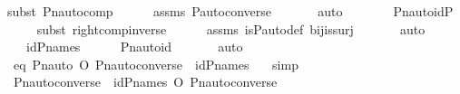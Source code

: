 \begin{isabellebody}
{\isacharparenleft}{\kern0pt}subst\ Pn{\isacharunderscore}{\kern0pt}auto{\isacharunderscore}{\kern0pt}comp{\isacharparenright}{\kern0pt}\isanewline
\ \ \ \ \isamarkupfalse%
\ assms\ P{\isacharunderscore}{\kern0pt}auto{\isacharunderscore}{\kern0pt}converse\ \isanewline
\ \ \ \ \isamarkupfalse%
\ auto\isanewline
\ \ \isamarkupfalse%
\ \isamarkupfalse%
\ {\isachardoublequoteopen}{\isachardot}{\kern0pt}{\isachardot}{\kern0pt}{\isachardot}{\kern0pt}\ {\isacharequal}{\kern0pt}\ Pn{\isacharunderscore}{\kern0pt}auto{\isacharparenleft}{\kern0pt}id{\isacharparenleft}{\kern0pt}P{\isacharparenright}{\kern0pt}{\isacharparenright}{\kern0pt}{\isachardoublequoteclose}\ \isanewline
\ \ \ \ \isamarkupfalse%
{\isacharparenleft}{\kern0pt}subst\ right{\isacharunderscore}{\kern0pt}comp{\isacharunderscore}{\kern0pt}inverse{\isacharparenright}{\kern0pt}\isanewline
\ \ \ \ \isamarkupfalse%
\ assms\ is{\isacharunderscore}{\kern0pt}P{\isacharunderscore}{\kern0pt}auto{\isacharunderscore}{\kern0pt}def\ bij{\isacharunderscore}{\kern0pt}is{\isacharunderscore}{\kern0pt}surj\ \isanewline
\ \ \ \ \isamarkupfalse%
\ auto\isanewline
\ \ \isamarkupfalse%
\ \isamarkupfalse%
\ {\isachardoublequoteopen}{\isachardot}{\kern0pt}{\isachardot}{\kern0pt}{\isachardot}{\kern0pt}\ {\isacharequal}{\kern0pt}\ id{\isacharparenleft}{\kern0pt}P{\isacharunderscore}{\kern0pt}names{\isacharparenright}{\kern0pt}{\isachardoublequoteclose}\isanewline
\ \ \ \ \isamarkupfalse%
\ Pn{\isacharunderscore}{\kern0pt}auto{\isacharunderscore}{\kern0pt}id\ \isanewline
\ \ \ \ \isamarkupfalse%
\ auto\isanewline
\ \ \isamarkupfalse%
\ \isamarkupfalse%
\ eq{\isacharcolon}{\kern0pt}\ {\isachardoublequoteopen}Pn{\isacharunderscore}{\kern0pt}auto{\isacharparenleft}{\kern0pt}{\isasympi}{\isacharparenright}{\kern0pt}\ O\ Pn{\isacharunderscore}{\kern0pt}auto{\isacharparenleft}{\kern0pt}converse{\isacharparenleft}{\kern0pt}{\isasympi}{\isacharparenright}{\kern0pt}{\isacharparenright}{\kern0pt}\ {\isacharequal}{\kern0pt}\ id{\isacharparenleft}{\kern0pt}P{\isacharunderscore}{\kern0pt}names{\isacharparenright}{\kern0pt}\ {\isachardoublequoteclose}\ \isamarkupfalse%
\ simp\isanewline
\isanewline
\ \ \isamarkupfalse%
\ {\isachardoublequoteopen}Pn{\isacharunderscore}{\kern0pt}auto{\isacharparenleft}{\kern0pt}converse{\isacharparenleft}{\kern0pt}{\isasympi}{\isacharparenright}{\kern0pt}{\isacharparenright}{\kern0pt}\ {\isacharequal}{\kern0pt}\ id{\isacharparenleft}{\kern0pt}P{\isacharunderscore}{\kern0pt}names{\isacharparenright}{\kern0pt}\ O\ Pn{\isacharunderscore}{\kern0pt}auto{\isacharparenleft}{\kern0pt}converse{\isacharparenleft}{\kern0pt}{\isasympi}{\isacharparenright}{\kern0pt}{\isacharparenright}{\kern0pt}{\isachardoublequoteclose}\ \isanewline

\end{isabellebody}
